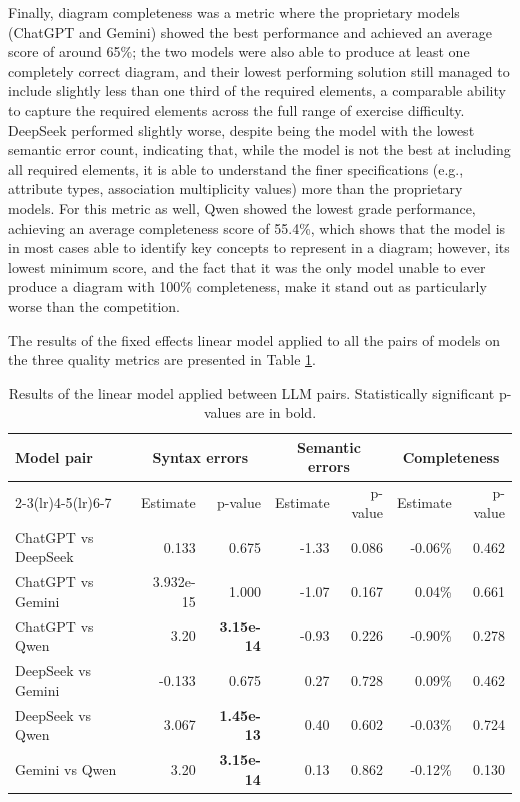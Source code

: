 Finally, diagram completeness was a metric where the proprietary models (ChatGPT and Gemini) showed the best performance and achieved an average score of around 65\%; the two models were also able to produce at least one completely correct diagram, and their lowest performing solution still managed to include slightly less than one third of the required elements, a comparable ability to capture the required elements across the full range of exercise difficulty. DeepSeek performed slightly worse, despite being the model with the lowest semantic error count, indicating that, while the model is not the best at including all required elements, it is able to understand the finer specifications (e.g., attribute types, association multiplicity values) more than the proprietary models. For this metric as well, Qwen showed the lowest grade performance, achieving an average completeness score of 55.4\%, which shows that the model is in most cases able to identify key concepts to represent in a diagram; however, its lowest minimum score, and the fact that it was the only model unable to ever produce a diagram with 100\% completeness, make it stand out as particularly worse than the competition.

The results of the fixed effects linear model applied to all the pairs of models on the three quality metrics are presented in Table \ref{tab:rq1_llm4mod4_lm}.

\begin{table}[ht]
\centering
\caption{Results of the linear model applied between LLM pairs. Statistically significant p-values are in bold.}
\label{tab:rq1_llm4mod4_lm}
\small
\begin{tabular}{lrrrrrr}
\toprule
Model pair & \multicolumn{2}{c}{Syntax errors} & \multicolumn{2}{c}{Semantic errors} &
\multicolumn{2}{c}{Completeness} \\
\cmidrule(lr){2-3}\cmidrule(lr){4-5}\cmidrule(lr){6-7}
& Estimate & p-value & Estimate & p-value & Estimate & p-value \\
\midrule
ChatGPT vs DeepSeek & 0.133  & 0.675  & -1.33 & 0.086  & -0.06\% & 0.462 \\
ChatGPT vs Gemini   & 3.932e-15 & 1.000 & -1.07 & 0.167  & 0.04\%  & 0.661 \\
ChatGPT vs Qwen     & 3.20  & \textbf{3.15e-14} & -0.93 & 0.226  & -0.90\% & 0.278 \\
DeepSeek vs Gemini  & -0.133 & 0.675 &  0.27  & 0.728  &  0.09\% & 0.462 \\
DeepSeek vs Qwen    & 3.067  & \textbf{1.45e-13} &  0.40  & 0.602  & -0.03\% & 0.724 \\
Gemini vs Qwen      & 3.20  & \textbf{3.15e-14} &  0.13  & 0.862  & -0.12\% & 0.130 \\
\bottomrule
\end{tabular}
\end{table}

